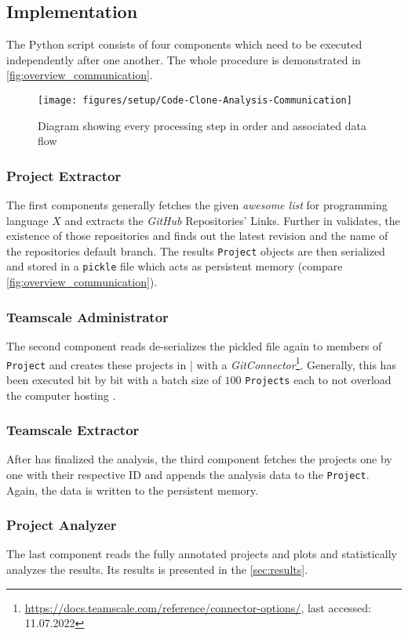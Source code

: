 \subsection{Implementation}
\label{sec:implementation}

The Python script consists of four components which need to be executed independently after one another. The whole procedure is demonstrated in \autoref{fig:overview_communication}.

\begin{figure}[tbh]
	\centering
	\texttt{[image: figures/setup/Code-Clone-Analysis-Communication]}
	\caption{Diagram showing every processing step in order and associated data flow}
	\label{fig:overview_communication}
\end{figure}

\subsubsection{Project Extractor}

The first components generally fetches the given \textit{awesome list} for programming language $X$ and extracts the \textit{GitHub} Repositories' Links. Further in validates, the existence of those repositories and finds out the latest revision and the name of the repositories default branch. The results \texttt{Project} objects are then serialized and stored in a \texttt{pickle} file which acts as persistent memory (compare \autoref{fig:overview_communication}).

\subsubsection{Teamscale Administrator}

The second component reads de-serializes the pickled file again to members of \texttt{Project} and creates these projects in \teamscale|{} with a \textit{GitConnector}\footnote{\url{https://docs.teamscale.com/reference/connector-options/}, last accessed: 11.07.2022}. Generally, this has been executed bit by bit with a batch size of $100$ \texttt{Projects} each to not overload the computer hosting \teamscale{}.

\subsubsection{Teamscale Extractor}

After \teamscale{} has finalized the analysis, the third component fetches the projects one by one with their respective ID and appends the analysis data to the \texttt{Project}. Again, the data is written to the persistent memory.

\subsubsection{Project Analyzer}

The last component reads the fully annotated projects and plots and statistically analyzes the results. Its results is presented in the \autoref{sec:results}.